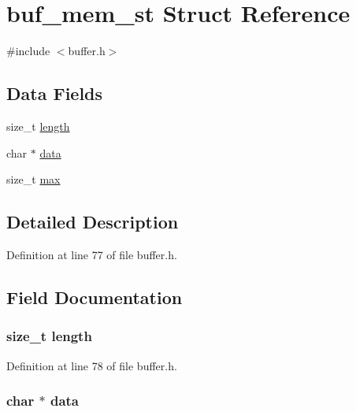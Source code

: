 \hypertarget{structbuf__mem__st}{}\section{buf\+\_\+mem\+\_\+st Struct Reference}
\label{structbuf__mem__st}


{\ttfamily \#include $<$buffer.\+h$>$}

\subsection*{Data Fields}
\begin{DoxyCompactItemize}
\item 
size\+\_\+t \hyperlink{structbuf__mem__st_ae809d5359ac030c60a30a8f0b2294b82}{length}
\item 
char $\ast$ \hyperlink{structbuf__mem__st_ab5dd39b3c6371b911a65f9b97dc61453}{data}
\item 
size\+\_\+t \hyperlink{structbuf__mem__st_a2f9ce5f01c066eb6ef649c9a2b0dbf0e}{max}
\end{DoxyCompactItemize}


\subsection{Detailed Description}


Definition at line 77 of file buffer.\+h.



\subsection{Field Documentation}
\subsubsection[{\texorpdfstring{length}{length}}]{\setlength{\rightskip}{0pt plus 5cm}size\+\_\+t length}\hypertarget{structbuf__mem__st_ae809d5359ac030c60a30a8f0b2294b82}{}\label{structbuf__mem__st_ae809d5359ac030c60a30a8f0b2294b82}


Definition at line 78 of file buffer.\+h.

\subsubsection[{\texorpdfstring{data}{data}}]{\setlength{\rightskip}{0pt plus 5cm}char $\ast$ data}\hypertarget{structbuf__mem__st_ab5dd39b3c6371b911a65f9b97dc61453}{}\label{structbuf__mem__st_ab5dd39b3c6371b911a65f9b97dc61453}


